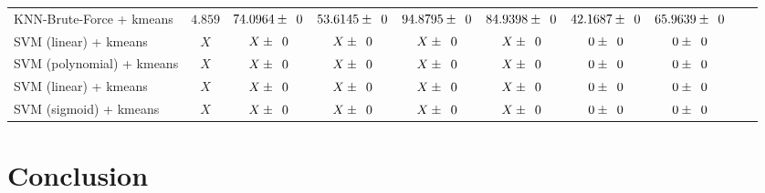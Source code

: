 \documentclass[twocolumn,10pt]{article}
\begin{document}
\begin{table*}[htb]
\begin{tabular}{@{}lccccccccl@{}}
    KNN-Brute-Force + kmeans  & $4.859$    & $74.0964 \pm \z{0}$               & $53.6145 \pm \z{0}$          & $94.8795 \pm \z{0}$         & $84.9398 \pm \z{0}$        & $42.1687 \pm \z{0}$    & $65.9639 \pm \z{0}$\\
    SVM (linear) + kmeans     & $X$        & $X \pm \z{0}$                     & $X \pm \z{0}$           & $X \pm \z{0}$                  & $X \pm \z{0}$         & $0 \pm \z{0}$                    & $0 \pm \z{0}$\\
    SVM (polynomial) + kmeans & $X$        & $X \pm \z{0}$                     & $X \pm \z{0}$           & $X \pm \z{0}$                  & $X \pm \z{0}$         & $0 \pm \z{0}$                    & $0 \pm \z{0}$\\
    SVM (linear) + kmeans     & $X$        & $X \pm \z{0}$                     & $X \pm \z{0}$           & $X \pm \z{0}$                  & $X \pm \z{0}$         & $0 \pm \z{0}$                    & $0 \pm \z{0}$\\
    SVM (sigmoid) + kmeans    & $X$        & $X \pm \z{0}$                     & $X \pm \z{0}$           & $X \pm \z{0}$                  & $X \pm \z{0}$         & $0 \pm \z{0}$                    & $0 \pm \z{0}$\\
    \bottomrule
    \end{tabular}
    \label{table:gene_expression_result}
      \vspace{-\baselineskip}
  \end{table*}
  
\section{Conclusion}



\end{document}
